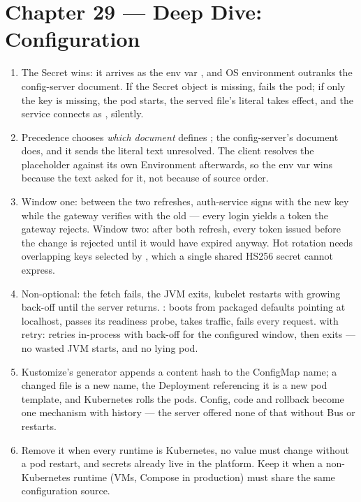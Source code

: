 \section*{Chapter 29 --- Deep Dive: Configuration}
\begin{enumerate}
  \item The Secret wins: it arrives as the env var
  , and OS environment outranks the
  config-server document. If the Secret object is missing,
   fails the pod; if only the key is missing, the pod
  starts, the served file's literal  takes effect, and the
  service connects as , silently.
  \item Precedence chooses \emph{which document} defines
  ; the config-server's document does, and it
  sends the literal text 
  unresolved. The client resolves the placeholder against its own
  Environment afterwards, so the env var wins because the text asked
  for it, not because of source order.
  \item Window one: between the two refreshes, auth-service signs with
  the new key while the gateway verifies with the old --- every login
  yields a token the gateway rejects. Window two: after both refresh,
  every token issued before the change is rejected until it would have
  expired anyway. Hot rotation needs overlapping keys selected by
  , which a single shared HS256 secret cannot express.
  \item Non-optional: the fetch fails, the JVM exits, kubelet restarts
  with growing back-off until the server returns. :
  boots from packaged defaults pointing at localhost, passes its
  readiness probe, takes traffic, fails every request. 
  with retry: retries in-process with back-off for the configured
  window, then exits --- no wasted JVM starts, and no lying pod.
  \item Kustomize's generator appends a content hash to the ConfigMap
  name; a changed file is a new name, the Deployment referencing it is
  a new pod template, and Kubernetes rolls the pods. Config, code and
  rollback become one mechanism with history --- the server offered
  none of that without Bus or restarts.
  \item Remove it when every runtime is Kubernetes, no value must
  change without a pod restart, and secrets already live in the
  platform. Keep it when a non-Kubernetes runtime (VMs, Compose in
  production) must share the same configuration source.
\end{enumerate}

